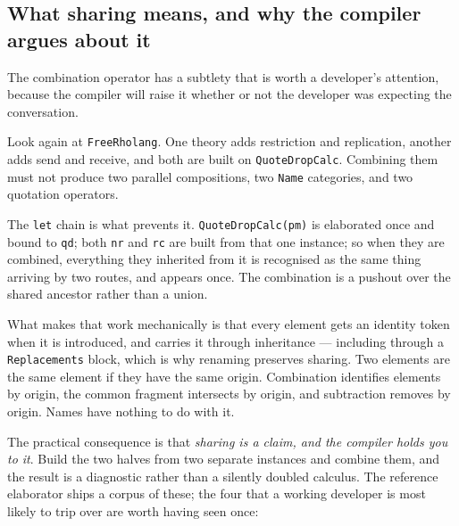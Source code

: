 \subsection{What sharing means, and why the compiler argues about it}
\label{sec:sharing}

The combination operator has a subtlety that is worth a developer's attention,
because the compiler will raise it whether or not the developer was expecting
the conversation.

Look again at \texttt{FreeRholang}. One theory adds restriction and replication,
another adds send and receive, and both are built on \texttt{QuoteDropCalc}.
Combining them must not produce two parallel compositions, two \texttt{Name}
categories, and two quotation operators.

The \texttt{let} chain is what prevents it. \texttt{QuoteDropCalc(pm)} is
elaborated once and bound to \texttt{qd}; both \texttt{nr} and \texttt{rc} are
built from that one instance; so when they are combined, everything they
inherited from it is recognised as the same thing arriving by two routes, and
appears once. The combination is a pushout over the shared ancestor rather than
a union.

What makes that work mechanically is that every element gets an identity token
when it is introduced, and carries it through inheritance --- including through
a \texttt{Replacements} block, which is why renaming preserves sharing. Two
elements are the same element if they have the same origin. Combination
identifies elements by origin, the common fragment intersects by origin, and
subtraction removes by origin. Names have nothing to do with it.

The practical consequence is that \emph{sharing is a claim, and the compiler
holds you to it}. Build the two halves from two separate instances and combine
them, and the result is a diagnostic rather than a silently doubled calculus.
The reference elaborator ships a corpus of these; the four that a working
developer is most likely to trip over are worth having seen once:


